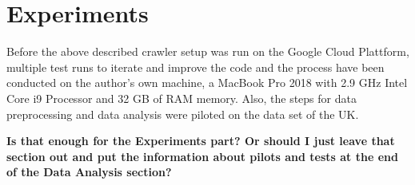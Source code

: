 \section{Experiments}
Before the above described crawler setup was run on the Google Cloud Plattform, multiple test runs to iterate and improve the code and the process have been conducted on the author's own machine, a MacBook Pro 2018 with 2.9 GHz Intel Core i9 Processor and 32 GB of RAM memory. Also, the steps for data preprocessing and data analysis were piloted on the data set of the UK.
\vspace{3pt}
\begin{center}
    \textbf{Is that enough for the Experiments part? Or should I just leave that section out and put the information about pilots and tests at the end of the Data Analysis section?}
\end{center}